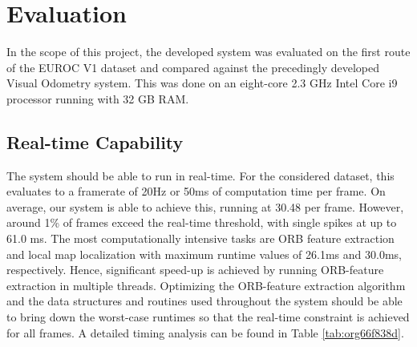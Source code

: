 \documentclass[a4paper, 10pt]{article}
\begin{document}
\section{Evaluation}
\label{sec:orgdf75c18}
In the scope of this project, the developed system was evaluated on the first route of the EUROC V1 dataset \cite{euroc} and compared against the precedingly developed Visual Odometry system.
This was done on an eight-core 2.3 GHz Intel Core i9 processor running with 32 GB RAM.

\subsection{Real-time Capability}
\label{sec:org9e51d01}
The system should be able to run in real-time. For the considered dataset, this evaluates to a framerate of 20Hz or 50ms of computation time per frame. 
On average, our system is able to achieve this, running at 30.48 per frame. However, around 1\% of frames exceed the real-time threshold, with single spikes at up to 61.0 ms.
The most computationally intensive tasks are ORB feature extraction and local map localization with maximum runtime values of 26.1ms and 30.0ms, respectively.
Hence, significant speed-up is achieved by running ORB-feature extraction in multiple threads.
Optimizing the ORB-feature extraction algorithm and the data structures and routines used throughout the system should be able to bring down the worst-case 
runtimes so that the real-time constraint is achieved for all frames.
A detailed timing analysis can be found in Table \ref{tab:org66f838d}. 
\end{document}
